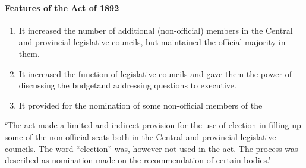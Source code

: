 \begin{multicols}{2}
\paragraph{Features of the Act of 1892}
\begin{enumerate}
  \item It increased the number of additional (non-official) members in the Central and provincial legislative councils, but maintained the official majority in them.
  \item It increased the function of legislative councils and gave them the power of discussing the budget\endnote and addressing questions to executive.
  \item It provided for the nomination of some non-official members of the
\end{enumerate}
`The act made a limited and indirect provision for the use of election in filling up some of the non-official seats both in the Central and provincial legislative councils. The word ``election'' was, however not used in the act. The process was described as nomination made on the recommendation of certain bodies\endnote.'


\end{multicols}
